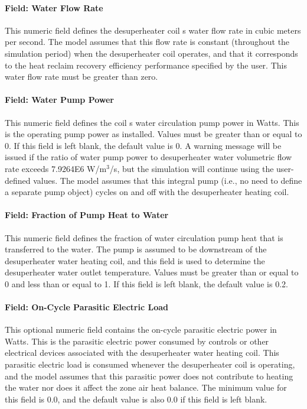 \paragraph{Field: Water Flow Rate}\label{field-water-flow-rate}

This numeric field defines the desuperheater coil s water flow rate in cubic meters per second. The model assumes that this flow rate is constant (throughout the simulation period) when the desuperheater coil operates, and that it corresponds to the heat reclaim recovery efficiency performance specified by the user. This water flow rate must be greater than zero.

\paragraph{Field: Water Pump Power}\label{field-water-pump-power}

This numeric field defines the coil s water circulation pump power in Watts. This is the operating pump power as installed. Values must be greater than or equal to 0. If this field is left blank, the default value is 0. A warning message will be issued if the ratio of water pump power to desuperheater water volumetric flow rate exceeds 7.9264E6 W/m\(^{3}\)/s, but the simulation will continue using the user-defined values. The model assumes that this integral pump (i.e., no need to define a separate pump object) cycles on and off with the desuperheater heating coil.

\paragraph{Field: Fraction of Pump Heat to Water}\label{field-fraction-of-pump-heat-to-water}

This numeric field defines the fraction of water circulation pump heat that is transferred to the water. The pump is assumed to be downstream of the desuperheater water heating coil, and this field is used to determine the desuperheater water outlet temperature. Values must be greater than or equal to 0 and less than or equal to 1. If this field is left blank, the default value is 0.2.

\paragraph{Field: On-Cycle Parasitic Electric Load}\label{field-on-cycle-parasitic-electric-load}

This optional numeric field contains the on-cycle parasitic electric power in Watts. This is the parasitic electric power consumed by controls or other electrical devices associated with the desuperheater water heating coil. This parasitic electric load is consumed whenever the desuperheater coil is operating, and the model assumes that this parasitic power does not contribute to heating the water nor does it affect the zone air heat balance. The minimum value for this field is 0.0, and the default value is also 0.0 if this field is left blank.

